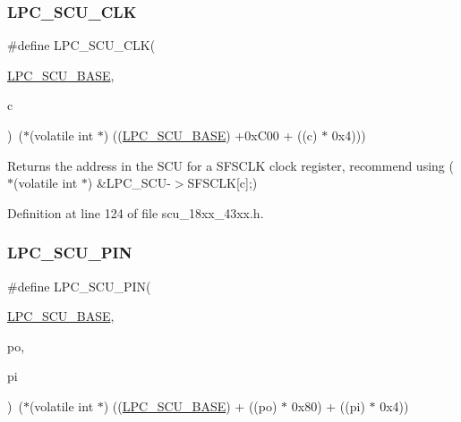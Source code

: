 \subsubsection{\texorpdfstring{L\+P\+C\+\_\+\+S\+C\+U\+\_\+\+C\+LK}{LPC\_SCU\_CLK}}
{\footnotesize\ttfamily \#define L\+P\+C\+\_\+\+S\+C\+U\+\_\+\+C\+LK(\begin{DoxyParamCaption}\item[{}]{\hyperlink{group___p_e_r_i_p_h__43_x_x___b_a_s_e_gacd777eafbfcbc5701c9728c9261b1bd1}{L\+P\+C\+\_\+\+S\+C\+U\+\_\+\+B\+A\+SE},  }\item[{}]{c }\end{DoxyParamCaption})~($\ast$(volatile int $\ast$) ((\hyperlink{group___p_e_r_i_p_h__43_x_x___b_a_s_e_gacd777eafbfcbc5701c9728c9261b1bd1}{L\+P\+C\+\_\+\+S\+C\+U\+\_\+\+B\+A\+SE}) +0x\+C00 + ((c) $\ast$ 0x4)))}

Returns the address in the S\+CU for a S\+F\+S\+C\+LK clock register, recommend using ($\ast$(volatile int $\ast$) \&L\+P\+C\+\_\+\+S\+C\+U-\/$>$S\+F\+S\+C\+LK\mbox{[}c\mbox{]};) 

Definition at line 124 of file scu\+\_\+18xx\+\_\+43xx.\+h.

\mbox{\label{group___s_c_u__18_x_x__43_x_x_ga339447eec03e1342c675fd3944347e50}} 
\subsubsection{\texorpdfstring{L\+P\+C\+\_\+\+S\+C\+U\+\_\+\+P\+IN}{LPC\_SCU\_PIN}}
{\footnotesize\ttfamily \#define L\+P\+C\+\_\+\+S\+C\+U\+\_\+\+P\+IN(\begin{DoxyParamCaption}\item[{}]{\hyperlink{group___p_e_r_i_p_h__43_x_x___b_a_s_e_gacd777eafbfcbc5701c9728c9261b1bd1}{L\+P\+C\+\_\+\+S\+C\+U\+\_\+\+B\+A\+SE},  }\item[{}]{po,  }\item[{}]{pi }\end{DoxyParamCaption})~($\ast$(volatile int $\ast$) ((\hyperlink{group___p_e_r_i_p_h__43_x_x___b_a_s_e_gacd777eafbfcbc5701c9728c9261b1bd1}{L\+P\+C\+\_\+\+S\+C\+U\+\_\+\+B\+A\+SE}) + ((po) $\ast$ 0x80) + ((pi) $\ast$ 0x4))}

